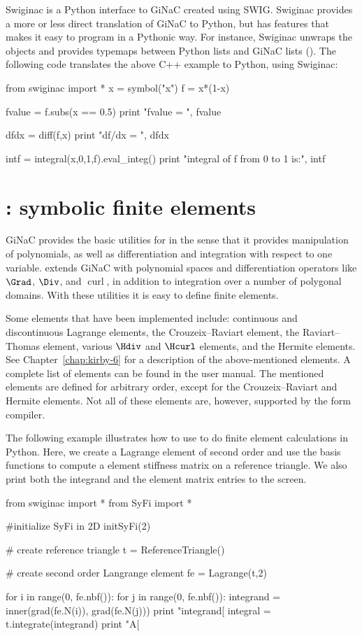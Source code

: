 Swiginac is a Python interface to GiNaC created using SWIG.  Swiginac
provides a more or less direct translation of GiNaC to Python, but has
features that makes it easy to program in a Pythonic way.  For instance,
Swiginac unwraps the  objects and provides typemaps between
Python lists and GiNaC lists ().  The following code translates
the above C++ example to Python, using Swiginac:
\begin{python}
from swiginac import *
x = symbol("x")
f = x*(1-x)

fvalue = f.subs(x == 0.5)
print "fvalue = ", fvalue

dfdx = diff(f,x)
print "df/dx = ", dfdx

intf = integral(x,0,1,f).eval_integ()
print "integral of f from 0 to 1 is:", intf
\end{python}

\section{\syfi{}: symbolic finite elements}

GiNaC provides the basic utilities for \syfi{} in the sense that it provides
manipulation of polynomials, as well as differentiation and integration
with respect to one variable. \syfi{} extends GiNaC with polynomial
spaces and differentiation operators like $\Grad$, $\Div$, and
$\operatorname{curl}$, in addition to integration over a number of polygonal
domains.  With these utilities it is easy to define finite elements.

Some elements that have been implemented include: continuous and
discontinuous Lagrange elements, the Crouzeix--Raviart element, the
Raviart--Thomas element, various $\Hdiv$ and $\Hcurl$ \nedelec{} elements, and
the Hermite elements. See Chapter~\ref{chap:kirby-6} for a description of
the above-mentioned elements.  A complete list of elements can be found in
the user manual. The mentioned elements are defined for arbitrary order,
except for the Crouzeix--Raviart and Hermite elements. Not all of these
elements are, however, supported by the form compiler.

The following example illustrates how to use \syfi{} to do finite element
calculations in Python.  Here, we create a Lagrange element of second
order and use the basis functions to compute a element stiffness matrix
on a reference triangle. We also print both the integrand and the element
matrix entries to the screen.
\begin{python}
from swiginac import *
from SyFi import *

#initialize SyFi in 2D
initSyFi(2)

# create reference triangle
t = ReferenceTriangle()

# create second order Langrange element
fe = Lagrange(t,2)

for i in range(0, fe.nbf()):
    for j in range(0, fe.nbf()):
        integrand = inner(grad(fe.N(i)), grad(fe.N(j)))
        print "integrand[%
        integral = t.integrate(integrand)
        print "A[%
\end{python}

